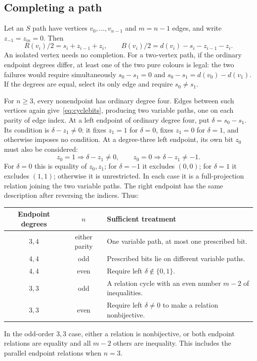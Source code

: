 \subsection{Completing a path}

Let an $S$ path have vertices $v_0,\ldots,v_{n-1}$ and $m=n-1$ edges,
and write $z_{-1}=z_m=0$. Then
\[
 R(v_i)/2=s_i+z_{i-1}+z_i,\qquad
 B(v_i)/2=d(v_i)-s_i-z_{i-1}-z_i.
\]
An isolated vertex needs no completion. For a two-vertex path, if the
ordinary endpoint degrees differ, at least one of the two pure colours
is legal: the two failures would require simultaneously
$s_0-s_1=0$ and $s_0-s_1=d(v_0)-d(v_1)$. If the degrees are equal,
select its only edge and require $s_0\ne s_1$.

For $n\ge3$, every nonendpoint has ordinary degree four. Edges between
such vertices again give~\eqref{eq:cyclebits}, producing two variable
paths, one on each parity of edge index. At a left endpoint of ordinary
degree four, put $\delta=s_0-s_1$. Its condition is
$\delta-z_1\ne0$: it fixes $z_1=1$ for $\delta=0$, fixes $z_1=0$ for
$\delta=1$, and otherwise imposes no condition. At a degree-three left
endpoint, its own bit $z_0$ must also be considered:
\begin{equation}\label{eq:threeendbits}
 z_0=1\Longrightarrow\delta-z_1\ne0,
 \qquad z_0=0\Longrightarrow\delta-z_1\ne-1.
\end{equation}
For $\delta=0$ this is equality of $z_0,z_1$; for $\delta=-1$ it
excludes $(0,0)$; for $\delta=1$ it excludes $(1,1)$; otherwise it is
unrestricted. In each case it is a full-projection relation joining the
two variable paths. The right endpoint has the same description after
reversing the indices. Thus:
\begin{center}\small
\begin{tabular}{ccl}
\toprule Endpoint degrees&$n$&Sufficient treatment\\\midrule
$3,4$&either parity&One variable path, at most one prescribed bit.\\
$4,4$&odd&Prescribed bits lie on different variable paths.\\
$4,4$&even&Require left $\delta\notin\{0,1\}$.\\
$3,3$&odd&A relation cycle with an even number $m-2$ of inequalities.\\
$3,3$&even&Require left $\delta\ne0$ to make a relation nonbijective.\\
\bottomrule
\end{tabular}
\end{center}
In the odd-order $3,3$ case, either a relation is nonbijective, or both
endpoint relations are equality and all $m-2$ others are inequality.
This includes the parallel endpoint relations when $n=3$.

